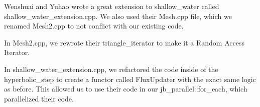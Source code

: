 \documentclass{article}
\begin{document}
Wenshuai and Yuhao wrote a great extension to shallow\_water called shallow\_water\_extension.cpp. We also used their Mesh.cpp file, which we renamed Mesh2.cpp to not conflict with our existing code. 

In Mesh2.cpp, we rewrote their triangle\_iterator to make it a Random Access Iterator.

In shallow\_water\_extension.cpp, we refactored the code inside of the hyperbolic\_step to create a functor called FluxUpdater with the exact same logic as before. This allowed us to use their code in our jb\_parallel::for\_each, which parallelized their code.

\end{document}
